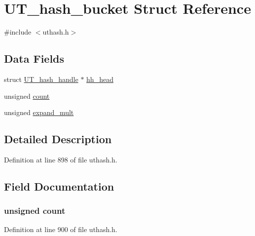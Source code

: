 \hypertarget{struct_u_t__hash__bucket}{}\section{U\+T\+\_\+hash\+\_\+bucket Struct Reference}
\label{struct_u_t__hash__bucket}


{\ttfamily \#include $<$uthash.\+h$>$}

\subsection*{Data Fields}
\begin{DoxyCompactItemize}
\item 
struct \hyperlink{struct_u_t__hash__handle}{U\+T\+\_\+hash\+\_\+handle} $\ast$ \hyperlink{struct_u_t__hash__bucket_a32d33f384f3c99c1fd80202e1cd64c0c}{hh\+\_\+head}
\item 
unsigned \hyperlink{struct_u_t__hash__bucket_a6a9e89d63eb610dfe238b0a840979421}{count}
\item 
unsigned \hyperlink{struct_u_t__hash__bucket_a49a220a340de3b9ed14648a82472ab84}{expand\+\_\+mult}
\end{DoxyCompactItemize}


\subsection{Detailed Description}


Definition at line 898 of file uthash.\+h.



\subsection{Field Documentation}
\subsubsection[{\texorpdfstring{count}{count}}]{\setlength{\rightskip}{0pt plus 5cm}unsigned count}\hypertarget{struct_u_t__hash__bucket_a6a9e89d63eb610dfe238b0a840979421}{}\label{struct_u_t__hash__bucket_a6a9e89d63eb610dfe238b0a840979421}


Definition at line 900 of file uthash.\+h.

